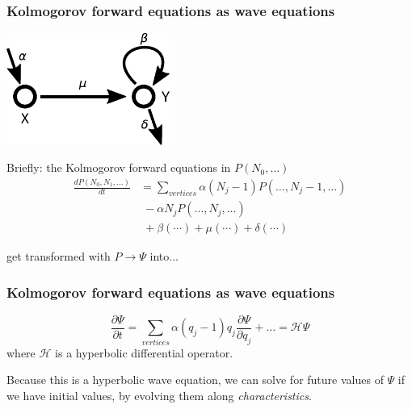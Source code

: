 \documentclass{beamer}
\begin{document}
\begin{frame}
    \frametitle{Kolmogorov forward equations as wave equations}

    \begin{center}
            \includegraphics[width=0.4\textwidth]{figures/diagram1}
    \end{center}

        Briefly: the Kolmogorov forward equations in $P(N_0, \dots)$
    \begin{align}
        \frac{d P(N_0, N_1, \dots)}{dt} &= \sum_{vertices} \alpha (N_j - 1)
        P(\dots, N_j - 1, \dots) \nonumber \\
        &\; - \alpha N_j P(\dots, N_j, \dots) \nonumber \\
        &\; + \beta (\cdots) + \mu (\cdots) + \delta (\cdots) \nonumber
    \end{align}

    get transformed with $P \rightarrow \Psi$ into...

\end{frame}

\begin{frame}
    \frametitle{Kolmogorov forward equations as wave equations}
    \begin{equation}
        \frac{\partial \Psi}{\partial t} = \sum_{vertices} \alpha (q_j - 1) q_j
        \frac{\partial \Psi}{\partial q_j} + \dots = \mathcal{H}\Psi
    \end{equation}
    where $\mathcal{H}$ is a hyperbolic differential operator.

    Because this is a hyperbolic wave equation, we can solve for future values
    of $\Psi$ if we have initial values, by evolving them along
    \emph{characteristics}.

\end{frame}
\end{document}
